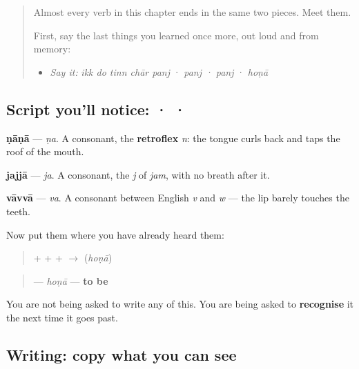 \label{lesson:PA-S07-naana-jajja-vavva}



\begin{quote}
Almost every verb in this chapter ends in the same two pieces. Meet them.

First, say the last things you learned once more, out loud and from memory:

\begin{itemize}
\raggedright
  \item \emph{Say it:} \emph{ikk do tinn chār panj} · \emph{panj · panj} · \emph{hoṇā}
\end{itemize}
\end{quote}

\subsection*{Script you'll notice:  ·  · }
\begin{quote}
\end{quote}

\textbf{ṇāṇā} — \emph{ṇa}. A consonant, the \textbf{retroflex} \emph{n}: the tongue curls back and taps the roof of the mouth.

\begin{quote}
\end{quote}

\textbf{jajjā} — \emph{ja}. A consonant, the \emph{j} of \emph{jam}, with no breath after it.

\begin{quote}
\end{quote}

\textbf{vāvvā} — \emph{va}. A consonant between English \emph{v} and \emph{w} — the lip barely touches the teeth.

Now put them where you have already heard them:

\begin{quote}
\textbf{} + \textbf{} + \textbf{} + \textbf{} $\to$ \textbf{} (\emph{hoṇā})
\end{quote}

\begin{quote}
\textbf{} — \emph{hoṇā} — \textbf{to be}
\end{quote}

You are not being asked to write any of this. You are being asked to \textbf{recognise} it the next time it goes past.

\subsection*{Writing: copy what you can see}

